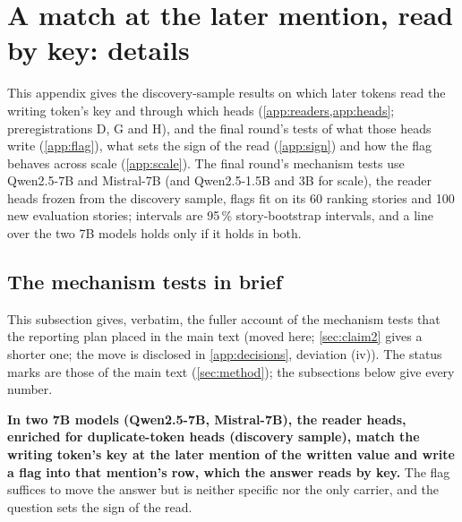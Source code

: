 \section{A match at the later mention, read by key: details}\label{app:claim2}

This appendix gives the discovery-sample results on which later tokens read the writing token's key and through which heads (\cref{app:readers,app:heads}; preregistrations D, G and H), and the final round's tests of what those heads write (\cref{app:flag}), what sets the sign of the read (\cref{app:sign}) and how the flag behaves across scale (\cref{app:scale}). The final round's mechanism tests use Qwen2.5-7B and Mistral-7B (and Qwen2.5-1.5B and 3B for scale), the reader heads frozen from the discovery sample, flags fit on its 60 ranking stories and 100 new evaluation stories; intervals are 95\,\% story-bootstrap intervals, and a line over the two 7B models holds only if it holds in both.

\subsection{The mechanism tests in brief}\label{app:claim2-brief}

This subsection gives, verbatim, the fuller account of the mechanism tests that the reporting plan placed in the main text (moved here; \cref{sec:claim2} gives a shorter one; the move is disclosed in \cref{app:decisions}, deviation (iv)). The status marks are those of the main text (\cref{sec:method}); the subsections below give every number.

\textbf{In two 7B models (Qwen2.5-7B, Mistral-7B), the reader heads, enriched for duplicate-token heads (discovery sample), match the writing token's key at the later mention of the written value and write a flag into that mention's row, which the answer reads by key.} The flag suffices to move the answer but is neither specific nor the only carrier, and the question sets the sign of the read.


